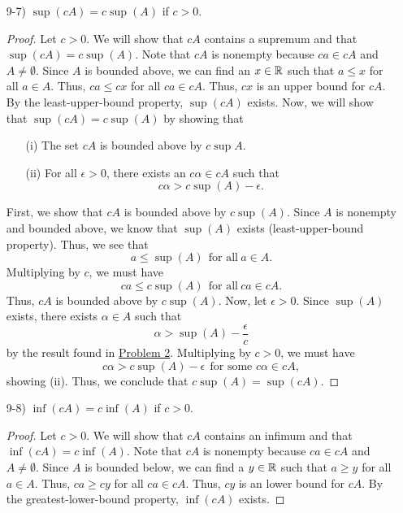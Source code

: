 \documentclass[11pt,a4paper]{article}
\begin{document}
\begin{enumerate}
\begin{enumerate}
\begin{proof}
            \end{proof}
        \item[9-7)] \( \sup(cA) = c \sup (A)  \) if \( c > 0  \).
               \begin{proof}
                   Let \( c > 0  \). We will show that \( cA  \) contains a supremum and that \( \sup(cA) = c\sup(A) \). Note that \( cA   \) is nonempty because \( ca \in cA  \) and \( A \neq \emptyset \). Since \( A  \) is bounded above, we can find an \( x \in \mathbb{R}  \) such that \( a \leq x  \) for all \( a \in A  \). Thus, \( ca \leq cx  \) for all \( ca \in cA  \). Thus, \( cx  \) is an upper bound for \( cA  \). By the least-upper-bound property, \( \sup(cA) \) exists.
                   Now, we will show that \( \sup(cA) = c \sup(A) \) by showing that  
                   \begin{enumerate}
                       \item[(i)] The set \( cA  \) is bounded above by \( c \sup A  \). \\ 
                        \item[(ii)] For all \( \epsilon > 0  \), there exists an \( c \alpha \in cA  \) such that 
                            \[  c \alpha > c \sup(A) - \epsilon. \]
                   \end{enumerate}
                   First, we show that \( cA  \) is bounded above by \( c \sup(A) \). Since \( A  \) is nonempty and bounded above, we know that \( \sup(A) \) exists (least-upper-bound property). Thus, we see that  
                   \[  a \leq \sup(A) \ \ \text{for all} \ a \in A.   \]
                   Multiplying by \( c  \), we must have
                   \[  ca \leq c \sup(A) \ \ \text{for all} \  ca \in cA. \]
                   Thus, \( cA  \) is bounded above by \( c \sup(A) \).
                   Now, let \( \epsilon > 0 \). Since \( \sup(A)  \) exists, there exists \( \alpha \in A  \) such that   
                   \[  \alpha > \sup(A) - \frac{ \epsilon }{ c }  \]
                   by the result found in {\hyperref[Problem 2]{Problem 2}}.
                   Multiplying by \( c > 0  \), we must have
                   \[  c \alpha > c \sup(A) - \epsilon \ \ \text{for some } c \alpha \in cA,   \]
                   showing (ii).
                   Thus, we conclude that \( c \sup(A) = \sup(cA) \).

               \end{proof} 
        \item[9-8)] \( \inf(cA) = c \inf (A)  \) if \( c > 0  \).
            \begin{proof}
            Let \( c > 0  \). We will show that \( cA  \) contains an infimum and that \( \inf(cA) = c\inf(A) \). Note that \( cA   \) is nonempty because \( ca \in cA  \) and \( A \neq \emptyset \). Since \( A  \) is bounded below, we can find a \( y \in \mathbb{R}  \) such that \( a \geq y  \) for all \( a \in A  \). Thus, \( ca \geq cy  \) for all \( ca \in cA  \). Thus, \( cy  \) is an lower bound for \( cA  \). By the greatest-lower-bound property, \( \inf(cA) \) exists.


\end{proof}
\end{enumerate}
\end{enumerate}
\end{document}
